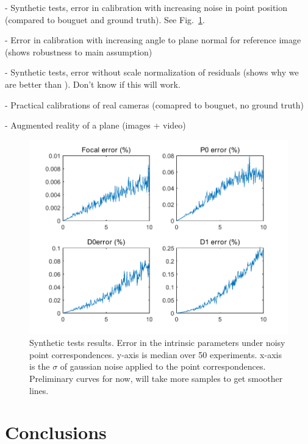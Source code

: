 \documentclass[10pt,twocolumn,letterpaper]{article}
\begin{document}
- Synthetic tests, error in calibration with increasing noise in point position (compared to bouguet and ground truth). See Fig.~\ref{fig:synth_results}.

- Error in calibration with increasing angle to plane normal for reference image (shows robustness to main assumption)

- Synthetic tests, error without scale normalization of residuals (shows why we are better than \cite{bocquillon2006}). Don't know if this will work.

- Practical calibrations of real cameras (comapred to bouguet, no ground truth)

- Augmented reality of a plane (images + video)

\begin{figure}
\includegraphics[width=\linewidth]{images/resultsPointNoise.pdf}
\caption{Synthetic tests results. Error in the intrinsic parameters under noisy point correspondences. y-axis is median over 50 experiments. x-axis is the $\sigma$ of gaussian noise applied to the point correspondences. Preliminary curves for now, will take more samples to get smoother lines.}
\label{fig:synth_results}
\end{figure}

\section{Conclusions}

{\small


}
\end{document}
